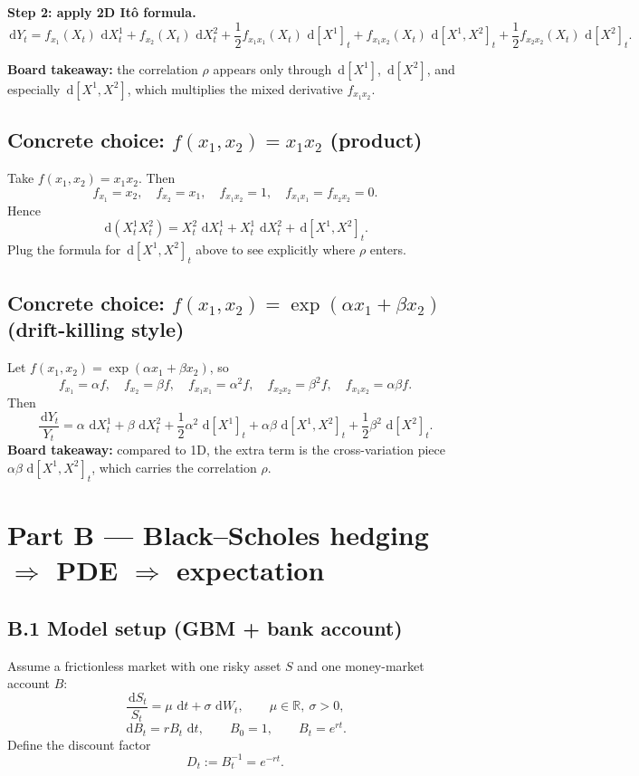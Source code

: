 \documentclass[11pt]{article}
\theoremstyle{definition}
\theoremstyle{remark}
\newcommand{\R}{\mathbb{R}}
\newcommand{\1}{\mathbf{1}}
\newcommand{\dd}{\,\mathrm{d}}
\theoremstyle{definition}
\begin{document}
\medskip
\textbf{Step 2: apply 2D It\^o formula.}
\[
\dd Y_t
=
f_{x_1}(X_t)\,\dd X_t^1
+
f_{x_2}(X_t)\,\dd X_t^2
+\frac12 f_{x_1x_1}(X_t)\,\dd[X^1]_t
+ f_{x_1x_2}(X_t)\,\dd[X^1,X^2]_t
+\frac12 f_{x_2x_2}(X_t)\,\dd[X^2]_t.
\]

\textbf{Board takeaway:} the correlation $\rho$ appears only through $\dd[X^1]$, $\dd[X^2]$, and especially $\dd[X^1,X^2]$,
which multiplies the mixed derivative $f_{x_1x_2}$.

\subsection*{Concrete choice: $f(x_1,x_2)=x_1x_2$ (product)}
Take $f(x_1,x_2)=x_1x_2$. Then
\[
f_{x_1}=x_2,\quad f_{x_2}=x_1,\quad f_{x_1x_2}=1,\quad f_{x_1x_1}=f_{x_2x_2}=0.
\]
Hence
\[
\dd(X_t^1X_t^2)
=
X_t^2\,\dd X_t^1 + X_t^1\,\dd X_t^2 + \dd[X^1,X^2]_t.
\]
Plug the formula for $\dd[X^1,X^2]_t$ above to see explicitly where $\rho$ enters.

\subsection*{Concrete choice: $f(x_1,x_2)=\exp(\alpha x_1+\beta x_2)$ (drift-killing style)}
Let $f(x_1,x_2)=\exp(\alpha x_1+\beta x_2)$, so
\[
f_{x_1}=\alpha f,\quad f_{x_2}=\beta f,\quad
f_{x_1x_1}=\alpha^2 f,\quad f_{x_2x_2}=\beta^2 f,\quad f_{x_1x_2}=\alpha\beta f.
\]
Then
\[
\frac{\dd Y_t}{Y_t}
=
\alpha\,\dd X_t^1 + \beta\,\dd X_t^2
+\frac12\alpha^2\,\dd[X^1]_t
+\alpha\beta\,\dd[X^1,X^2]_t
+\frac12\beta^2\,\dd[X^2]_t.
\]
\textbf{Board takeaway:} compared to 1D, the extra term is the cross-variation piece
$\alpha\beta\,\dd[X^1,X^2]_t$, which carries the correlation $\rho$.

\section*{Part B --- Black--Scholes hedging $\Rightarrow$ PDE $\Rightarrow$ expectation}

\subsection*{B.1 Model setup (GBM + bank account)}
Assume a frictionless market with one risky asset $S$ and one money-market account $B$:
\[
\frac{\dd S_t}{S_t}=\mu\,\dd t+\sigma\,\dd W_t,
\qquad \mu\in\R,\ \sigma>0,
\]
\[
\dd B_t=rB_t\,\dd t,\qquad B_0=1,\qquad B_t=e^{rt}.
\]
Define the discount factor
\[
D_t:=B_t^{-1}=e^{-rt}.
\]
\end{document}
